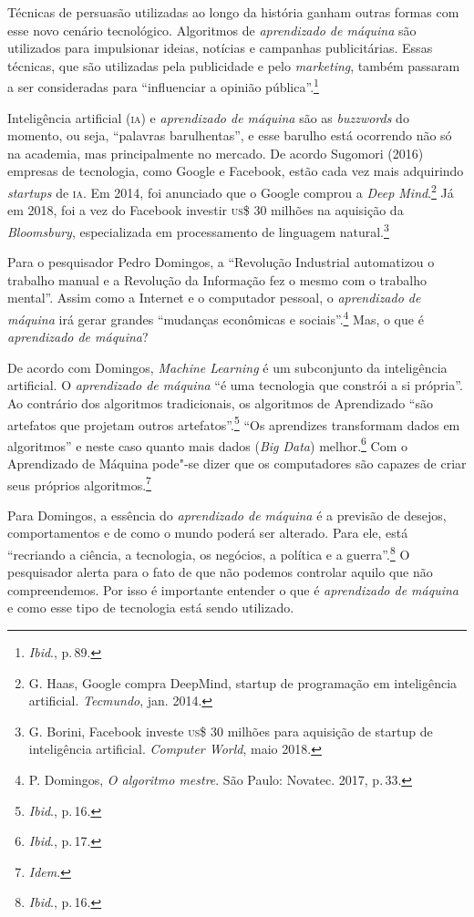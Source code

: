 Técnicas de persuasão utilizadas ao longo da história ganham outras
formas com esse novo cenário tecnológico. Algoritmos de \textit{aprendizado de
máquina} são utilizados para impulsionar ideias, notícias e campanhas
publicitárias. Essas técnicas, que são utilizadas pela publicidade e
pelo \textit{marketing}, também passaram a ser consideradas para ``influenciar a
opinião pública''.\footnote{\textit{Ibid}., p.\,89.}

Inteligência artificial (\textsc{ia}) e \textit{aprendizado de máquina} são as
\textit{buzzwords} do momento, ou seja, ``palavras barulhentas'', e esse
barulho está ocorrendo não só na academia, mas principalmente no
mercado. De acordo Sugomori (2016) empresas de tecnologia, como Google e
Facebook, estão cada vez mais adquirindo \textit{startups} de \textsc{ia}. Em 2014,
foi anunciado que o Google comprou a \textit{Deep Mind}.\footnote{G. Haas, Google compra DeepMind, startup de programação
em inteligência artificial. \textit{Tecmundo}, jan. 2014.} Já
em 2018, foi a vez do Facebook investir \textsc{us}\$ 30 milhões na aquisição da
\textit{Bloomsbury}, especializada em processamento de linguagem natural.\footnote{G. Borini, Facebook investe \textsc{us}\$ 30 milhões para
aquisição de startup de inteligência artificial. \textit{Computer World}, maio 2018. }

Para o pesquisador Pedro Domingos, a ``Revolução Industrial
automatizou o trabalho manual e a Revolução da Informação fez o mesmo
com o trabalho mental''. Assim como a Internet e o computador
pessoal, o \textit{aprendizado de máquina} irá gerar grandes ``mudanças
econômicas e sociais''.\footnote{P. Domingos, \textit{O algoritmo mestre}. São Paulo: Novatec. 2017, p.\,33.} Mas, o que é \textit{aprendizado de máquina}?

De acordo com Domingos, \textit{Machine Learning} é um subconjunto da inteligência artificial. O \textit{aprendizado de máquina} ``é uma tecnologia que constrói a
si própria''. Ao contrário dos algoritmos tradicionais, os algoritmos de
Aprendizado ``são artefatos que projetam outros artefatos''.\footnote{\textit{Ibid}., p.\,16.}
``Os aprendizes transformam dados em algoritmos'' e neste caso quanto
mais dados (\textit{Big Data}) melhor.\footnote{\textit{Ibid}., p.\,17.} Com o Aprendizado de
Máquina pode"-se dizer que os computadores são capazes de criar seus
próprios algoritmos.\footnote{\textit{Idem}.}

Para Domingos, a essência do \textit{aprendizado de máquina} é a previsão
de desejos, comportamentos e de como o mundo poderá ser alterado. Para
ele, está ``recriando a ciência, a tecnologia,
os negócios, a política e a guerra''.\footnote{\textit{Ibid}., p.\,16.} O pesquisador alerta para
o fato de que não podemos controlar aquilo que não compreendemos. Por
isso é importante entender o que é \textit{aprendizado de máquina} e como esse
tipo de tecnologia está sendo utilizado.

